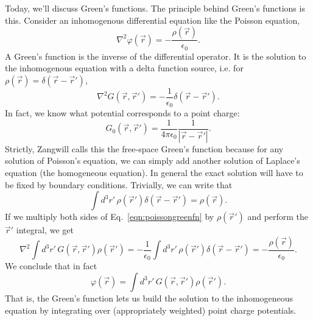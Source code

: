 Today, we'll discuss Green's functions. The principle behind Green's functions is this. Consider an inhomogenous differential equation like the Poisson equation,
\begin{equation}
    \nabla^2 \varphi(\vec r) = -\frac{\rho(\vec r)}{\epsilon_0}.
\end{equation}
A Green's function is the inverse of the differential operator. It is the solution to the inhomogenous equation with a delta function source, i.e. for $\rho(\vec r) = \delta(\vec r - \vec r')$,
\begin{equation}\label{eqn:poissongreenfn}
    \nabla^2 G(\vec r, \vec r') = -\frac{1}{\epsilon_0} \delta(\vec r - \vec r').
\end{equation}
In fact, we know what potential corresponds to a point charge:
\begin{equation}
    G_0(\vec r, \vec r') = \frac{1}{4\pi \epsilon_0} \frac{1}{|\vec r - \vec r'|}.
\end{equation}
Strictly, Zangwill calls this the free-space Green's function because for any solution of Poisson's equation, we can simply add another solution of Laplace's equation (the homogeneous equation). In general the exact solution will have to be fixed by boundary conditions. Trivially, we can write that
\begin{equation}
    \int d^3 r' \, \rho(\vec r') \delta(\vec r-\vec r') = \rho(\vec r).
\end{equation}
If we multiply both sides of Eq.~\eqref{eqn:poissongreenfn} by $\rho(\vec r')$ and perform the $\vec r'$ integral, we get
\begin{equation}
    \nabla^2 \int d^3 r' \, G(\vec r,\vec r') \rho(\vec r') = -\frac{1}{\epsilon_0} \int d^3 r' \, \rho(\vec r') \delta(\vec r- \vec r') = -\frac{\rho(\vec r)}{\epsilon_0}.
\end{equation}
We conclude that in fact
\begin{equation}
    \varphi(\vec r) = \int d^3 r' \, G(\vec r, \vec r') \rho(\vec r').
\end{equation}
That is, the Green's function lets us build the solution to the inhomogeneous equation by integrating over (appropriately weighted) point charge potentials.

